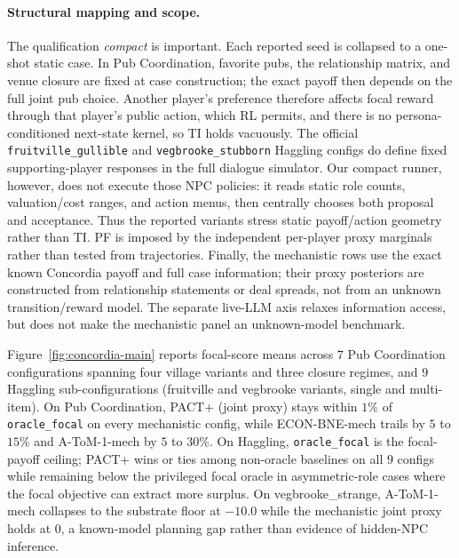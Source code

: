 \documentclass{article}
\def\textsuperscript#1{#1}%
\begin{document}
\paragraph{Structural mapping and scope.}
The qualification \emph{compact} is important.  Each reported seed is collapsed to a one-shot static case.  In Pub Coordination, favorite pubs, the relationship matrix, and venue closure are fixed at case construction; the exact payoff then depends on the full joint pub choice.  Another player's preference therefore affects focal reward through that player's public action, which RL permits, and there is no persona-conditioned next-state kernel, so TI holds vacuously.  The official \texttt{fruitville\_gullible} and \texttt{vegbrooke\_stubborn} Haggling configs do define fixed supporting-player responses in the full dialogue simulator.  Our compact runner, however, does not execute those NPC policies: it reads static role counts, valuation/cost ranges, and action menus, then centrally chooses both proposal and acceptance.  Thus the reported variants stress static payoff/action geometry rather than TI.  PF is imposed by the independent per-player proxy marginals rather than tested from trajectories.  Finally, the mechanistic rows use the exact known Concordia payoff and full case information; their proxy posteriors are constructed from relationship statements or deal spreads, not from an unknown transition/reward model.  The separate live-LLM axis relaxes information access, but does not make the mechanistic panel an unknown-model benchmark.

Figure~\ref{fig:concordia-main} reports focal-score means across $7$ Pub Coordination configurations spanning four village variants and three closure regimes, and $9$ Haggling sub-configurations (fruitville and vegbrooke variants, single and multi-item). On Pub Coordination, PACT\textsuperscript{+} (joint proxy) stays within $1\%$ of \texttt{oracle\_focal} on every mechanistic config, while ECON-BNE-mech trails by $5$ to $15\%$ and A-ToM-1-mech by $5$ to $30\%$. On Haggling, \texttt{oracle\_focal} is the focal-payoff ceiling; PACT\textsuperscript{+} wins or ties among non-oracle baselines on all $9$ configs while remaining below the privileged focal oracle in asymmetric-role cases where the focal objective can extract more surplus. On vegbrooke\_strange, A-ToM-1-mech collapses to the substrate floor at $-10.0$ while the mechanistic joint proxy holds at $0$, a known-model planning gap rather than evidence of hidden-NPC inference.
\end{document}
